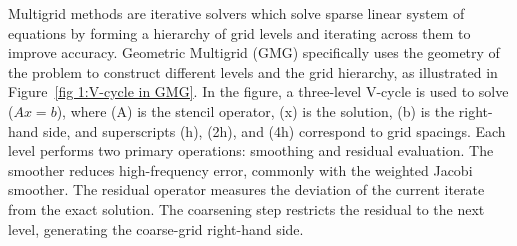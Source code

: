 \documentclass[sigconf]{acmart}
\begin{document}
Multigrid methods are iterative solvers which solve sparse linear system of equations by forming a hierarchy of grid levels and iterating across them to %
improve accuracy.  %
Geometric Multigrid (GMG) specifically uses the geometry of the problem to construct different levels and the grid hierarchy, as illustrated in Figure~\ref{fig 1:V-cycle in GMG}. 
In the figure, 
a three-level V-cycle is used to solve ($Ax = b$), where (A) is the stencil operator, (x) is the solution, (b) is the right-hand side, and superscripts (h), (2h), and (4h) correspond to grid spacings. Each level performs two primary operations: smoothing and residual evaluation. The smoother reduces high-frequency error, commonly with %
the weighted Jacobi smoother. %
The residual operator %
measures the deviation of the current iterate from the exact solution. The coarsening step restricts the residual to the next level, generating the coarse-grid right-hand side. %
\end{document}
